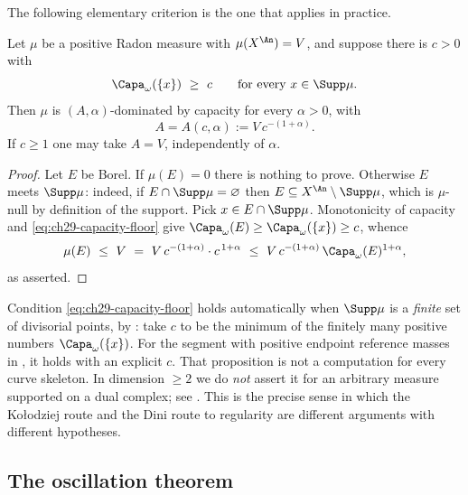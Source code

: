 The following elementary criterion is the one that applies in practice.

\begin{lemma}
\label{lem:ch29-capacity-floor}
Let $\mu$ be a positive Radon measure with $\mu(X^{\An})=V$, and suppose
there is $c>0$ with
\begin{equation}
\label{eq:ch29-capacity-floor}
 \Capa_\omega(\{x\})\ \geq\ c
 \qquad\text{for every }x\in\Supp\mu .
\end{equation}
Then $\mu$ is $(A,\alpha)$-dominated by capacity for every
$\alpha>0$, with
\[
 A=A(c,\alpha):=V\,c^{-(1+\alpha)} .
\]
If $c\geq1$ one may take $A=V$, independently of $\alpha$.
\end{lemma}

\begin{proof}
Let $E$ be Borel.  If $\mu(E)=0$ there is nothing to prove.  Otherwise
$E$ meets $\Supp\mu$: indeed, if $E\cap\Supp\mu=\varnothing$ then
$E\subseteq X^{\An}\setminus\Supp\mu$, which is $\mu$-null by
definition of the support.  Pick $x\in E\cap\Supp\mu$.  Monotonicity of
capacity and \eqref{eq:ch29-capacity-floor} give
$\Capa_\omega(E)\geq\Capa_\omega(\{x\})\geq c$, whence
\[
 \mu(E)\ \leq\ V
 \ =\ V\,c^{-(1+\alpha)}\cdot c^{\,1+\alpha}
 \ \leq\ V\,c^{-(1+\alpha)}\,\Capa_\omega(E)^{1+\alpha},
\]
as asserted.
\end{proof}

\begin{remark}
\label{rem:ch29-floor-availability}
Condition \eqref{eq:ch29-capacity-floor} holds automatically when
$\Supp\mu$ is a \emph{finite} set of divisorial points, by
: take $c$ to be the minimum of the
finitely many positive numbers $\Capa_\omega(\{x\})$.  For the segment with positive endpoint reference masses in
, it holds with an explicit $c$.
That proposition is not a computation for every curve skeleton.  In dimension $\geq2$ we do \emph{not} assert it for an arbitrary
measure supported on a dual complex; see
.  This is the precise sense in which the
Ko\l odziej route and the Dini route to regularity are different arguments
with different hypotheses.
\end{remark}

\subsection{The oscillation theorem}
\label{sec:ch29-linfty}


